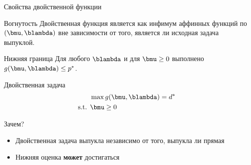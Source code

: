 \documentclass[12pt]{beamer}
\begin{document}
\begin{frame}{Свойства двойственной функции}
\small
\begin{block}{Вогнутость}
Двойственная функция является {\color{red}{вогнутой}} как инфимум аффинных функций по $(\bmu, \blambda)$ вне зависимости от того, является ли исходная задача выпуклой.
\end{block}

\begin{block}{Нижняя граница}
Для любого $\blambda$ и для $\bmu \geq 0$ выполнено $g(\bmu, \blambda) \leq p^*$.
\end{block}

\begin{block}{Двойственная задача}
\vspace{-5mm}
\begin{equation*}
\begin{split}
& \max g(\bmu, \blambda) = d^*\\
\text{s.t. } & \bmu \geq 0
\end{split}
\end{equation*}
\end{block}

\begin{block}{Зачем?}
\begin{itemize}
\vspace{-2mm}
\item Двойственная задача выпукла независимо от того, выпукла ли прямая
\vspace{-3mm}
\item Нижняя оценка \textbf{может} достигаться
\end{itemize}
\end{block}
\end{frame}
\end{document}
